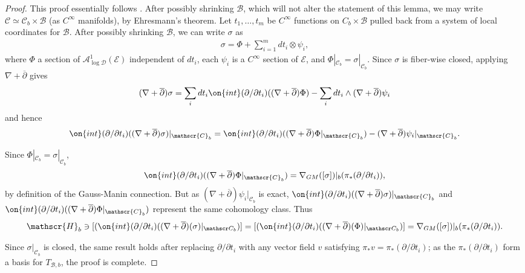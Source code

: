 \begin{proof}
	This proof essentially follows \cite[Proposition
	9.14]{Voisin:hodgeTheory}.
	After possibly shrinking $\mathscr B$, which will not alter the statement of this
	lemma, we may write $\mathscr C \simeq
	\mathscr C_b \times \mathscr B$ (as $C^\infty$ manifolds), by Ehresmann's theorem.
	Let $t_1, \ldots, t_m$ be $C^\infty$  functions on $C_b \times
	\mathscr B$ pulled back from a system of local coordinates for $\mathscr B$.
	After possibly shrinking $\mathscr B$, we can write
	$\sigma$ as
	\begin{align*}
		\sigma = \Phi + \sum_{i=1}^m dt_i \otimes \psi_i,
	\end{align*}
	where $\Phi$ a section of $\mathscr{A}^1_{\log \mathscr{D}}(\mathscr{E})$ independent of
	$dt_i$,
	each
	$\psi_i$ is a $C^\infty$ section of $\mathscr{E}$,
	and $\Phi|_{\mathscr C_b} = \sigma|_{\mathscr C_b}$.
	Since $\sigma$ is fiber-wise closed, applying $\nabla+\overline{\partial}$ gives
		\begin{align*}
		(\nabla+\overline{\partial}) \sigma = \sum_i dt_i
		\on{int}(\partial/\partial t_i)((\nabla+\overline{\partial})\Phi) - \sum_i dt_i \wedge (\nabla+\overline{\partial})
		\psi_i
	\end{align*}
	and hence
	\begin{align*}
		\on{int}(\partial/\partial t_i) ((\nabla+\overline{\partial})\sigma)|_{\mathscr{C}_b} =
	\on{int}(\partial/\partial t_i)((\nabla+\overline{\partial})\Phi|_{\mathscr{C}_b}) - (\nabla+\overline{\partial})
		\psi_i|_{\mathscr{C}_b}.
	\end{align*}

	Since $\Phi|_{\mathscr C_b} = \sigma|_{\mathscr C_b}$,
	$$\on{int}(\partial/\partial
	t_i)((\nabla+\overline{\partial})\Phi|_{\mathscr{C}_b}) =
	\nabla_{GM}([\sigma])|_b(\pi_*(\partial/\partial t_i)),$$ by definition of the Gauss-Manin connection.
	But as $(\nabla+\overline{\partial})
		\psi_i|_{\mathscr{C}_b}$ is exact,
		$\on{int}(\partial/\partial t_i) ((\nabla+\overline{\partial})\sigma)|_{\mathscr{C}_b}$ and $\on{int}(\partial/\partial t_i)((\nabla+\overline{\partial})\Phi|_{\mathscr{C}_b})$ represent the same cohomology class. Thus
\begin{align*}
	\mathscr{H}_b \ni [(\on{int}(\partial/\partial t_i)((\nabla+\overline{\partial})(\sigma)|_{\mathscr C_b})] =
		[(\on{int}(\partial/\partial t_i)((\nabla+\overline{\partial})(\Phi)|_{\mathscr C_b})] =
		\nabla_{GM}([\sigma])|_b(\pi_*(\partial/\partial t_i)).
\end{align*}

 Since
	$\sigma|_{\mathscr{C}_b}$ is closed,
	the same result holds after
	replacing $\partial/\partial t_i$ with any vector field $v$ satisfying
	$\pi_*v=\pi_*(\partial/\partial t_i)$;
	as the $\pi_*(\partial/\partial t_i)$ form a
	basis for $T_{\mathscr{B},b}$, the proof is complete.
		\end{proof}

